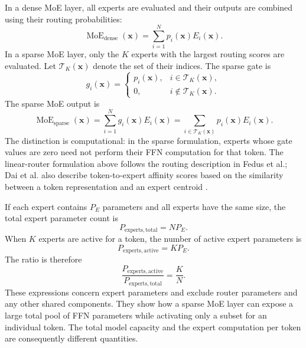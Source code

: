 In a dense MoE layer, all experts are evaluated and their outputs are
combined using their routing probabilities:
\begin{equation}
    \operatorname{MoE}_{\mathrm{dense}}(\mathbf{x})
    =
    \sum_{i=1}^{N}p_i(\mathbf{x})E_i(\mathbf{x}).
    \label{eq:moe-dense}
\end{equation}
In a sparse MoE layer, only the \(K\) experts with the largest routing
scores are evaluated. Let \(\mathcal{T}_K(\mathbf{x})\) denote the set
of their indices. The sparse gate is
\begin{equation}
    g_i(\mathbf{x})
    =
    \begin{cases}
        p_i(\mathbf{x}),
        & i\in\mathcal{T}_K(\mathbf{x}),\\
        0,
        & i\notin\mathcal{T}_K(\mathbf{x}).
    \end{cases}
    \label{eq:moe-sparse-gate}
\end{equation}
The sparse MoE output is
\begin{equation}
    \operatorname{MoE}_{\mathrm{sparse}}(\mathbf{x})
    =
    \sum_{i=1}^{N}g_i(\mathbf{x})E_i(\mathbf{x})
    =
    \sum_{i\in\mathcal{T}_K(\mathbf{x})}
    p_i(\mathbf{x})E_i(\mathbf{x}).
    \label{eq:moe-sparse-output}
\end{equation}
The distinction is computational: in the sparse formulation, experts
whose gate values are zero need not perform their FFN computation for
that token. The linear-router formulation above follows the routing
description in Fedus et al.; Dai et al. also describe token-to-expert
affinity scores based on the similarity between a token representation
and an expert centroid \parencite{fedus2022switch,dai2024deepseekmoe}.

If each expert contains \(P_E\) parameters and all experts have the same
size, the total expert parameter count is
\begin{equation}
    P_{\mathrm{experts,total}}
    =
    NP_E.
    \label{eq:moe-total-expert-parameters}
\end{equation}
When \(K\) experts are active for a token, the number of active expert
parameters is
\begin{equation}
    P_{\mathrm{experts,active}}
    =
    KP_E.
    \label{eq:moe-active-expert-parameters}
\end{equation}
The ratio is therefore
\begin{equation}
    \frac{P_{\mathrm{experts,active}}}
    {P_{\mathrm{experts,total}}}
    =
    \frac{K}{N}.
    \label{eq:moe-active-ratio}
\end{equation}
These expressions concern expert parameters and exclude router
parameters and any other shared components. They show how a sparse
MoE layer can expose a large total pool of FFN parameters while
activating only a subset for an individual token. The total model
capacity and the expert computation per token are consequently
different quantities.


